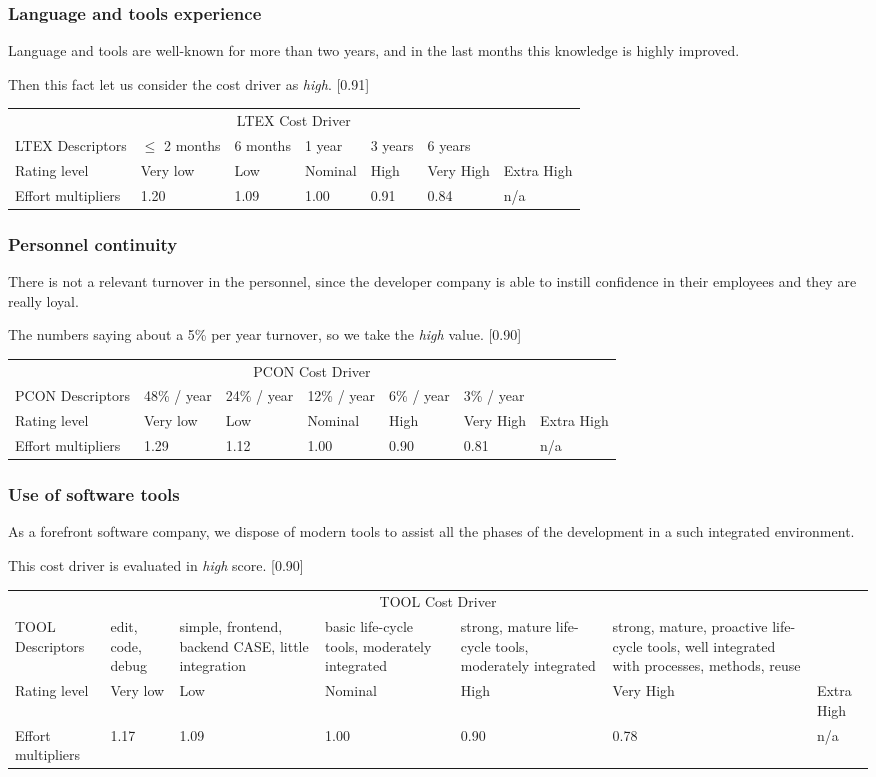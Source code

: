 \documentclass{scrreprt}
\newcommand{\costdescriptors}[7]{
	#1 & #2 & #3 & #4 & #5 & #6 & #7\\
}
\newcommand{\ratinglevel}[6]{
	Rating level & #1 & #2 & #3 & #4 & #5 & #6 \\\hline
}
\newcommand{\effortmultipliers}[6]{
	Effort multipliers & #1 & #2 & #3 & #4 & #5 & #6 \\\hline
}
\newenvironment{costdriverstable}[1]{
	\setlength{\LTleft}{-40pt}
	\begin{longtable}{|p{\dimexpr.16\textwidth}|p{\dimexpr.14\textwidth}|p{\dimexpr.14\textwidth}|p{\dimexpr.14\textwidth}|p{\dimexpr.14\textwidth}|p{\dimexpr.14\textwidth}|p{\dimexpr.14\textwidth}|}
	\hline
	\multicolumn{7}{|c|}{{#1}}\\\hhline{|=======|}
}{
	\hline\end{longtable}
}
\begin{document}
\subsubsection{Language and tools experience}
Language and tools are well-known for more than two years, and in the last months this knowledge is highly improved.

Then this fact let us consider the cost driver as \emph{high}. [0.91]
	
		\begin{costdriverstable}{LTEX Cost Driver}
		\costdescriptors{LTEX Descriptors}{$\le$ 2 months}{6 months}{1 year}{3 years}{6 years}{}\hline
		\ratinglevel{Very low}{Low}{Nominal}{High}{Very High}{Extra High}
		\effortmultipliers{1.20}{1.09}{1.00}{\cellcolor[gray]{0.75}0.91}{0.84}{n/a}
	\end{costdriverstable}
	
\subsubsection{Personnel continuity}
There is not a relevant turnover in the personnel, since the developer company is able to instill confidence in their employees and they are really loyal.

The numbers saying about a 5\% per year turnover, so we take the \emph{high} value. [0.90]
	
		\begin{costdriverstable}{PCON Cost Driver}
		\costdescriptors{PCON Descriptors}{48\% / year}{24\% / year}{12\% / year}{6\% / year}{3\% / year}{}\hline	
		\ratinglevel{Very low}{Low}{Nominal}{High}{Very High}{Extra High}
		\effortmultipliers{1.29}{1.12}{1.00}{\cellcolor[gray]{0.75}0.90}{0.81}{n/a}
	\end{costdriverstable}
	
\subsubsection{Use of software tools}

As a forefront software company, we dispose of modern tools to assist all the phases of the development in a such integrated environment.

This cost driver is evaluated in \emph{high} score. [0.90]
	
		\begin{costdriverstable}{TOOL Cost Driver}
		\costdescriptors{TOOL Descriptors}{edit, code, debug}{simple, frontend, backend CASE, little integration}{basic life-cycle tools, moderately integrated}{strong, mature life-cycle tools, moderately integrated}{strong, mature, proactive life-cycle tools, well integrated with processes, methods, reuse}{}\hline
		\ratinglevel{Very low}{Low}{Nominal}{High}{Very High}{Extra High}
		\effortmultipliers{1.17}{1.09}{1.00}{\cellcolor[gray]{0.75}0.90}{0.78}{n/a}	
	\end{costdriverstable}
	
\end{document}
